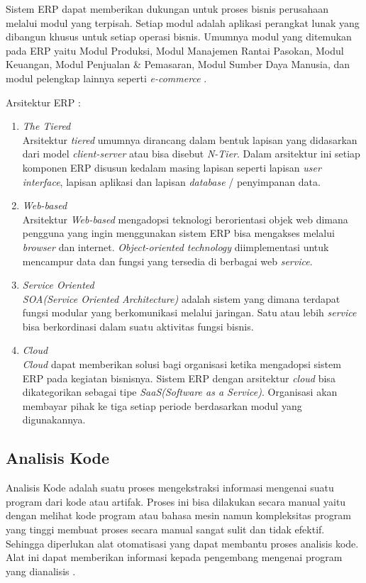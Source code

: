 Sistem ERP dapat memberikan dukungan untuk proses bisnis perusahaan melalui modul yang terpisah. Setiap modul adalah aplikasi perangkat lunak yang dibangun khusus untuk setiap operasi bisnis. Umumnya modul yang ditemukan pada ERP yaitu Modul Produksi, Modul Manajemen Rantai Pasokan, Modul Keuangan, Modul Penjualan \& Pemasaran, Modul Sumber Daya Manusia, dan modul pelengkap lainnya seperti \textit{e-commerce} \cite{D94}.

Arsitektur ERP \cite{D94}: 
\begin{enumerate}[leftmargin=1.3cm]
	\item \textit{The Tiered}\\
	Arsitektur \textit{tiered} umumnya dirancang dalam bentuk lapisan yang didasarkan dari model \textit{client-server} atau bisa disebut \textit{N-Tier}. Dalam arsitektur ini setiap komponen ERP disusun kedalam masing lapisan seperti lapisan \textit{user interface}, lapisan aplikasi dan lapisan \textit{database} / penyimpanan data.
	\item \textit{Web-based}\\
	Arsitektur \textit{Web-based} mengadopsi teknologi berorientasi objek web dimana pengguna yang ingin menggunakan sistem ERP bisa mengakses melalui \textit{browser} dan internet. \textit{Object-oriented technology} diimplementasi untuk mencampur data dan fungsi yang tersedia di berbagai web \textit{service}.
	\item \textit{Service Oriented}\\
	\textit{SOA(Service Oriented Architecture)} adalah sistem yang dimana terdapat fungsi  modular yang berkomunikasi melalui jaringan. Satu atau lebih \textit{service} bisa berkordinasi dalam suatu aktivitas fungsi bisnis. 
	\item \textit{Cloud}\\
	\textit{Cloud} dapat memberikan solusi bagi organisasi ketika mengadopsi sistem ERP pada kegiatan bisnisnya. Sistem ERP dengan arsitektur \textit{cloud} bisa dikategorikan sebagai tipe \textit{SaaS(Software as a Service)}. Organisasi akan membayar pihak ke tiga setiap periode berdasarkan modul yang digunakannya.\\ 
\end{enumerate}

\subsection{Analisis Kode}
Analisis Kode adalah suatu proses mengekstraksi informasi mengenai suatu program dari kode atau artifak. Proses ini bisa dilakukan secara manual yaitu dengan melihat kode program atau bahasa mesin namun kompleksitas program yang tinggi membuat proses secara manual sangat sulit dan tidak efektif. Sehingga diperlukan alat otomatisasi yang dapat membantu proses analisis kode. Alat ini dapat memberikan informasi kepada pengembang mengenai program yang dianalisis \cite{208}. 

